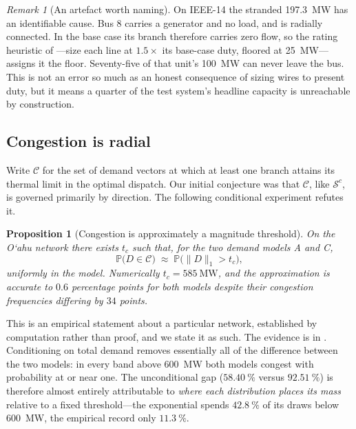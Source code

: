 \documentclass[11pt,a4paper]{article}
\theoremstyle{definition}
\theoremstyle{plain}
\newtheorem{proposition}[definition]{Proposition}
\theoremstyle{remark}
\newtheorem{remark}[definition]{Remark}
\newcommand{\Prob}{\mathbb{P}}
\newcommand{\okina}{\textquoteleft}
\begin{document}
\begin{remark}[An artefact worth naming]\label{rem:radial-gen}
On IEEE-14 the stranded \SI{197.3}{\mega\watt} has an identifiable cause. Bus 8
carries a generator and no load, and is radially connected. In the base case its
branch therefore carries zero flow, so the rating heuristic of
---size each line at $1.5\times$ its base-case duty, floored at
\SI{25}{\mega\watt}---assigns it the floor. Seventy-five of that unit's
\SI{100}{\mega\watt} can never leave the bus. This is not an error so much as an
honest consequence of sizing wires to present duty, but it means a quarter of the
test system's headline capacity is unreachable by construction.
\end{remark}

\subsection{Congestion is radial}

Write $\mathcal{C}$ for the set of demand vectors at which at least one branch
attains its thermal limit in the optimal dispatch. Our initial conjecture was
that $\mathcal{C}$, like $\mathcal{S}^c$, is governed primarily by direction. The
following conditional experiment refutes it.

\begin{proposition}[Congestion is approximately a magnitude threshold]
\label{prop:congestion-radial}
On the O\okina ahu network there exists $t_c$ such that, for the two demand
models A and C,
\[
\Prob\bigl(D \in \mathcal{C}\bigr) \;\approx\; \Prob\bigl(\lVert D\rVert_1 > t_c\bigr),
\]
uniformly in the model. Numerically $t_c = \SI{585}{\mega\watt}$, and the
approximation is accurate to $0.6$ percentage points for both models despite
their congestion frequencies differing by $34$ points.
\end{proposition}

This is an empirical statement about a particular network, established by
computation rather than proof, and we state it as such. The evidence is in
. Conditioning on total demand removes essentially all of the
difference between the two models: in every band above \SI{600}{\mega\watt} both
models congest with probability at or near one. The unconditional gap
($\SI{58.40}{\percent}$ versus $\SI{92.51}{\percent}$) is therefore almost
entirely attributable to \emph{where each distribution places its mass} relative
to a fixed threshold---the exponential spends $\SI{42.8}{\percent}$ of its draws
below \SI{600}{\mega\watt}, the empirical record only $\SI{11.3}{\percent}$.
\end{document}
